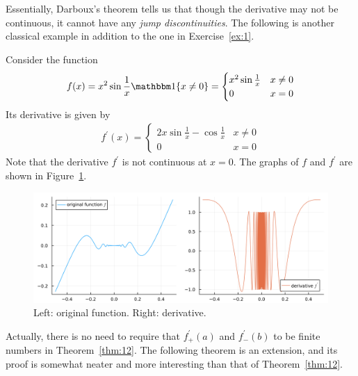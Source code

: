 \documentclass[thmcnt=section, 12pt]{my-elegantbook}
\begin{document}
\par Essentially, Darboux's theorem tells us that though the derivative may not be continuous, it cannot have any \textit{jump discontinuities}. The following is another classical example in addition to the one in Exercise~\ref{ex:1}.

\begin{example}
    Consider the function 
    \begin{align*}
        f(x) = x^2 \sin\frac{1}{x} \ind\{x \neq 0\}
        = \begin{cases}
            x^2 \sin\frac{1}{x}
            &x \neq 0 \\ 
            0 & x = 0
        \end{cases}
    \end{align*}
    Its derivative is given by 
    \begin{align*}
        f^\prime(x)
        = \begin{cases}
            2x \sin\frac{1}{x} - \cos\frac{1}{x}
            &x \neq 0 \\ 
            0 & x = 0
        \end{cases}
    \end{align*}
    Note that the derivative $f^\prime$ is not continuous at $x = 0$. The graphs of $f$ and $f^\prime$ are shown in Figure~\ref{fig:6}.
    \begin{figure}[ht]
        \centering
        \includegraphics[scale=0.2]{figures/graph-007.png}
        \caption{Left: original function. Right: derivative.}
        \label{fig:6}
    \end{figure}
\end{example}

\par Actually, there is no need to require that $f^\prime_{+}(a)$ and $f^\prime_{-}(b)$ to be finite numbers in Theorem~\ref{thm:12}. The following theorem is an extension, and its proof is somewhat neater and more interesting than that of Theorem~\ref{thm:12}.
\end{document}
